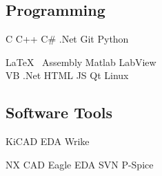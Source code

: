 \documentclass[]{deedy-resume-andrewvanhorn}
\begin{document}
\begin{minipage}[t]{0.33\textwidth}
\sectionsep


\section{}
\subsection{Programming}
C \textbullet{}  C++ \textbullet{} C\# .Net \textbullet{}
Git \textbullet{} Python

\LaTeX\ \textbullet{} Assembly \textbullet{}
Matlab \textbullet{} LabView \\ 
VB .Net \textbullet{} HTML \textbullet{} JS \textbullet{} Qt \textbullet{} Linux 
\sectionsep
\subsection{Software Tools}
KiCAD EDA \textbullet{} Wrike

NX CAD \textbullet{} Eagle EDA \textbullet{} SVN \textbullet{} P-Spice

\sectionsep

%
%

\end{minipage} 
\hfill
\end{document}
